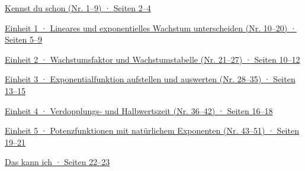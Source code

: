 \hyperlink{zone}{Kennst du schon (Nr. 1–9) · Seiten 2–4}\par\smallskip
\hyperlink{e1}{Einheit 1 · Lineares und exponentielles Wachstum unterscheiden (Nr. 10–20) · Seiten 5–9}\par\smallskip
\hyperlink{e2}{Einheit 2 · Wachstumsfaktor und Wachstumstabelle (Nr. 21–27) · Seiten 10–12}\par\smallskip
\hyperlink{e3}{Einheit 3 · Exponentialfunktion aufstellen und auswerten (Nr. 28–35) · Seiten 13–15}\par\smallskip
\hyperlink{e4}{Einheit 4 · Verdopplungs- und Halbwertszeit (Nr. 36–42) · Seiten 16–18}\par\smallskip
\hyperlink{e5}{Einheit 5 · Potenzfunktionen mit natürlichem Exponenten (Nr. 43–51) · Seiten 19–21}\par\smallskip
\hyperlink{abhaken}{Das kann ich · Seiten 22–23}\par\smallskip
